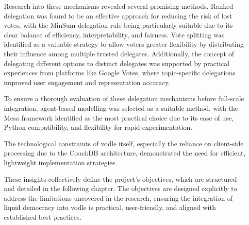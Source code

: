 Research into these mechanisms revealed several promising methods. Ranked delegation was found to be an effective approach for reducing the risk of lost votes, with the MinSum delegation rule being particularly suitable due to its clear balance of efficiency, interpretability, and fairness. Vote splitting was identified as a valuable strategy to allow voters greater flexibility by distributing their influence among multiple trusted delegates. Additionally, the concept of delegating different options to distinct delegates was supported by practical experiences from platforms like Google Votes, where topic-specific delegations improved user engagement and representation accuracy.

To ensure a thorough evaluation of these delegation mechanisms before full-scale integration, agent-based modelling was selected as a suitable method, with the Mesa framework identified as the most practical choice due to its ease of use, Python compatibility, and flexibility for rapid experimentation.

The technological constraints of vodle itself, especially the reliance on client-side processing due to the CouchDB architecture, demonstrated the need for efficient, lightweight implementation strategies.

These insights collectively define the project's objectives, which are structured and detailed in the following chapter. The objectives are designed explicitly to address the limitations uncovered in the research, ensuring the integration of liquid democracy into vodle is practical, user-friendly, and aligned with established best practices.